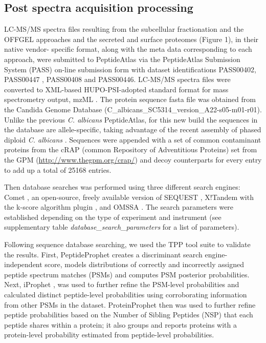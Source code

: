 \subsection*{Post spectra acquisition processing}

LC-MS/MS spectra files resulting from the subcellular fractionation and the OFFGEL
approaches and the secreted and surface proteomes (Figure 1), in their native vendor-
specific format, along with the meta data corresponding to each approach, were submitted to
PeptideAtlas via the PeptideAtlas Submission System (PASS) on-line submission form with
dataset identifications PASS00402, PASS00447 , PASS00408 and PASS00446. LC-MS/MS
spectra files were converted to XML-based HUPO-PSI-adopted standard format for mass
spectrometry output, mzML \citep{Martens2011}. The protein sequence fasta file was obtained from the
Candida Genome Database  (C\_albicans\_SC5314\_version\_A22-s05-m01-r01). Unlike the
previous \textit{C. albicans} PeptideAtlas, for this new build the sequences in the database are
allele-specific, taking advantage of the recent assembly of phased diploid \textit{C. albicans} \citep{Muzzey2013}.
Sequences were appended with a set of common contaminant proteins from the cRAP
(common Repository of Adventitious Proteins) set from the GPM \linebreak 
(\href{http://www.thegpm.org/crap/}{http://www.thegpm.org/crap/}) 
and decoy counterparts for every entry to add up a total of 25168 entries.

Then database searches was performed using three different search engines: Comet \citep{Eng2013},
an open-source, freely available version of SEQUEST \citep{Eng1994}, X!Tandem \citep{Craig2004} with the k-score
algorithm plugin \citep{MacLean2006}, and OMSSA \citep{Geer2004}. The search parameters were established depending
on the type of experiment and instrument (see supplementary table \textit{database\_search\_parameters} for a list of parameters).

Following sequence database searching, we used the TPP tool suite to validate the results.
First, PeptideProphet \citep{Keller2002} creates a discriminant search engine-independent score, models
distributions of correctly and incorrectly assigned peptide spectrum matches (PSMs) and
computes PSM posterior probabilities. Next, iProphet \citep{Shteynberg2011}, was used to further refine the
PSM-level probabilities and calculated distinct peptide-level probabilities using corroborating
information from other PSMs in the dataset. ProteinProphet \citep{Nesvizhskii2003} then was used to further
refine peptide probabilities based on the Number of Sibling Peptides (NSP) that each peptide
shares within a protein; it also groups and reports proteins with a protein-level probability
estimated from peptide-level probabilities.

